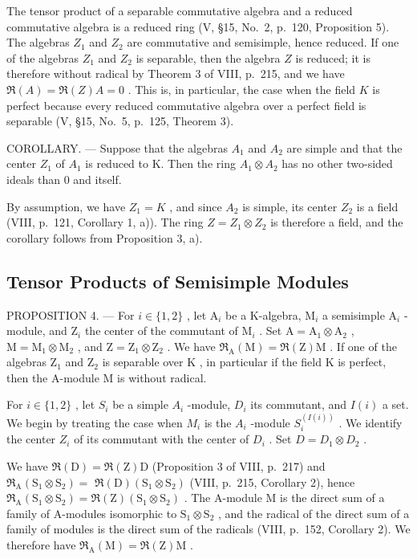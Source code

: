 The tensor product of a separable commutative algebra and a reduced commutative algebra is a reduced ring (V, §15, No.~2, p.~120, Proposition 5). The algebras \(Z_1\) and \(Z_2\) are commutative and semisimple, hence reduced. If one of the algebras \(Z_1\) and \(Z_2\) is separable, then the algebra \(Z\) is reduced; it is therefore without radical by Theorem 3 of VIII, p.~215, and we have \(\Re(A) = \Re(Z)A = 0\) . This is, in particular, the case when the field \(K\) is perfect because every reduced commutative algebra over a perfect field is separable (V, §15, No.~5, p.~125, Theorem 3).

COROLLARY. --- Suppose that the algebras \(A_{1}\) and \(A_{2}\) are simple and that the center \(Z_{1}\) of \(A_{1}\) is reduced to K. Then the ring \(A_{1} \otimes A_{2}\) has no other two-sided ideals than 0 and itself.

By assumption, we have \(Z_{1} = K\) , and since \(A_{2}\) is simple, its center \(Z_{2}\) is a field (VIII, p.~121, Corollary 1, a)). The ring \(Z = Z_{1} \otimes Z_{2}\) is therefore a field, and the corollary follows from Proposition 3, a).

\subsection{Tensor Products of Semisimple Modules}

PROPOSITION 4. --- For \(i \in \{1,2\}\) , let \(\mathrm{A}_i\) be a K-algebra, \(\mathrm{M}_i\) a semisimple \(\mathrm{A}_i\) -module, and \(\mathrm{Z}_i\) the center of the commutant of \(\mathrm{M}_i\) . Set \(\mathrm{A} = \mathrm{A}_1 \otimes \mathrm{A}_2\) , \(\mathrm{M} = \mathrm{M}_1 \otimes \mathrm{M}_2\) , and \(\mathrm{Z} = \mathrm{Z}_1 \otimes \mathrm{Z}_2\) . We have \(\Re_{\mathrm{A}}(\mathrm{M}) = \Re(\mathrm{Z})\mathrm{M}\) . If one of the algebras \(\mathrm{Z}_1\) and \(\mathrm{Z}_2\) is separable over \(\mathrm{K}\) , in particular if the field \(\mathrm{K}\) is perfect, then the A-module \(\mathrm{M}\) is without radical.

For \(i \in \{1,2\}\) , let \(S_i\) be a simple \(A_i\) -module, \(D_i\) its commutant, and \(I(i)\) a set. We begin by treating the case when \(M_i\) is the \(A_i\) -module \(S_i^{(I(i))}\) . We identify the center \(Z_i\) of its commutant with the center of \(D_i\) . Set \(D = D_1 \otimes D_2\) .

We have \(\Re (\mathrm{D}) = \Re (\mathrm{Z})\mathrm{D}\) (Proposition 3 of VIII, p.~217) and \(\Re_{\mathrm{A}}(\mathrm{S}_1\otimes \mathrm{S}_2) =\) \(\Re (\mathrm{D})(\mathrm{S}_1\otimes \mathrm{S}_2)\) (VIII, p.~215, Corollary 2), hence \(\Re_{\mathrm{A}}(\mathrm{S}_1\otimes \mathrm{S}_2) = \Re (\mathrm{Z})(\mathrm{S}_1\otimes \mathrm{S}_2)\) . The A-module M is the direct sum of a family of A-modules isomorphic to \(\mathrm{S}_1\otimes \mathrm{S}_2\) , and the radical of the direct sum of a family of modules is the direct sum of the radicals (VIII, p.~152, Corollary 2). We therefore have \(\Re_{\mathrm{A}}(\mathrm{M}) = \Re (\mathrm{Z})\mathrm{M}\) .

